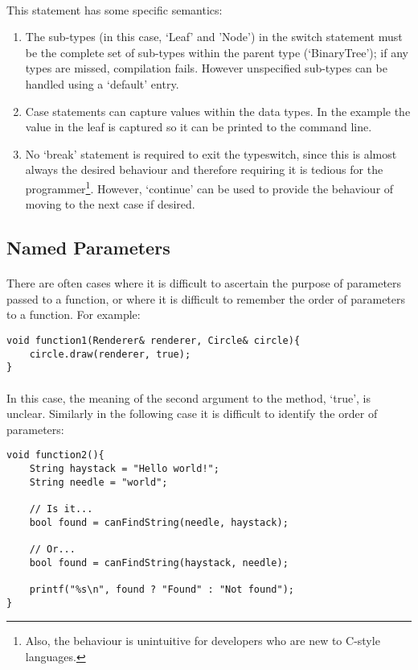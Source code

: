 \documentclass[12pt,twoside,notitlepage]{report}
\begin{document}
\paragraph{}
This statement has some specific semantics:

\begin{enumerate}
\item The sub-types (in this case, `Leaf' and 'Node') in the switch statement must be the complete set of sub-types within the parent type (`BinaryTree'); if any types are missed, compilation fails. However unspecified sub-types can be handled using a `default' entry.
\item Case statements can capture values within the data types. In the example the value in the leaf is captured so it can be printed to the command line.
\item No `break' statement is required to exit the typeswitch, since this is almost always the desired behaviour and therefore requiring it is tedious for the programmer\footnote{Also, the behaviour is unintuitive for developers who are new to C-style languages.}. However, `continue' can be used to provide the behaviour of moving to the next case if desired.
\end{enumerate}

\subsection{Named Parameters}

\paragraph{}
There are often cases where it is difficult to ascertain the purpose of parameters passed to a function, or where it is difficult to remember the order of parameters to a function. For example:

\small{
\begin{verbatim}
void function1(Renderer& renderer, Circle& circle){
    circle.draw(renderer, true);
}
\end{verbatim}
}

\paragraph{}
In this case, the meaning of the second argument to the method, `true', is unclear. Similarly in the following case it is difficult to identify the order of parameters:

\small{
\begin{verbatim}
void function2(){
    String haystack = "Hello world!";
    String needle = "world";
    
    // Is it...
    bool found = canFindString(needle, haystack);
    
    // Or...
    bool found = canFindString(haystack, needle);
    
    printf("%s\n", found ? "Found" : "Not found");
}
\end{verbatim}
}
\end{document}
